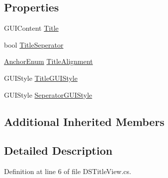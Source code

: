 \subsection*{Properties}
\begin{DoxyCompactItemize}
\item 
G\+U\+I\+Content \hyperlink{class_d_s_title_view_af317c06b95eab8c9e876afbfe60bb82e}{Title}
\item 
bool \hyperlink{class_d_s_title_view_a6fcf5594ac0a89cf0b9ffc15cba759df}{Title\+Seperator}
\item 
\hyperlink{class_d_s_view_a8b41b9ec1b18bd33872a37cbd3a2dbe1}{Anchor\+Enum} \hyperlink{class_d_s_title_view_a24d42521a3eb5c4d452ee39861d9beb1}{Title\+Alignment}
\item 
G\+U\+I\+Style \hyperlink{class_d_s_title_view_a77311fd48c0f267cfecf55552c460f80}{Title\+G\+U\+I\+Style}
\item 
G\+U\+I\+Style \hyperlink{class_d_s_title_view_a2477e370b44e411587715d5c91d7419c}{Seperator\+G\+U\+I\+Style}
\end{DoxyCompactItemize}
\subsection*{Additional Inherited Members}


\subsection{Detailed Description}


Definition at line 6 of file D\+S\+Title\+View.\+cs.



